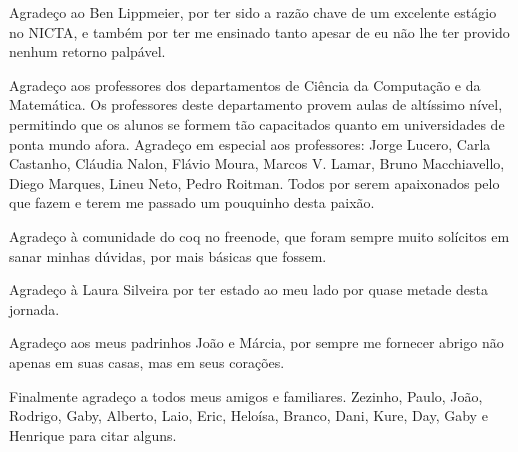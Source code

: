 \documentclass[bacharelado]{unb-cic}
\theoremstyle{definition}
\theoremstyle{definition}
\begin{document}
\begin{agradecimentos}
    Agradeço ao Ben Lippmeier, por ter sido a razão chave de um excelente estágio
    no NICTA, e também por ter me ensinado tanto apesar de eu não lhe ter provido nenhum retorno palpável. 

    Agradeço aos professores dos departamentos de Ciência da Computação e da Matemática.
    Os professores deste departamento provem aulas de altíssimo nível,
    permitindo que os alunos se formem tão capacitados quanto em universidades
    de ponta mundo afora.
    Agradeço em especial aos professores: Jorge Lucero, Carla Castanho, Cláudia Nalon, Flávio Moura, Marcos V. Lamar, Bruno Macchiavello, Diego Marques, Lineu Neto, Pedro Roitman. Todos por serem apaixonados pelo que fazem e terem
      me passado um pouquinho desta paixão.

    Agradeço à comunidade do coq no freenode, que foram sempre muito solícitos em
    sanar minhas dúvidas, por mais básicas que fossem.

    Agradeço à Laura Silveira por ter estado ao meu lado por quase metade desta jornada.

    Agradeço aos meus padrinhos João e Márcia, por sempre me fornecer abrigo não apenas em suas casas, mas em seus corações.

    Finalmente agradeço a todos meus amigos e familiares. Zezinho, Paulo, 
    João, Rodrigo, Gaby, Alberto, Laio, Eric, Heloísa, Branco, Dani, Kure, Day, Gaby e Henrique para citar alguns.
  \end{agradecimentos}


  
  \tableofcontents
  \printglossary
  \listoffigures
  \listoftables

  \textual    
  
  
  
  
  
  


  \postextual
  
  
\end{document}
